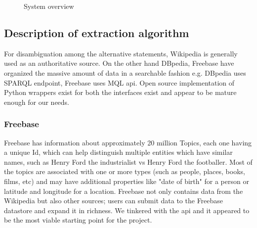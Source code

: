 \documentclass[11pt]{article}
\begin{document}
\begin{figure}
  \centering
  \caption{System overview}
  \label{fig:system}
\end{figure}


\subsection{Description of extraction algorithm}

For disambiguation among the alternative statements, Wikipedia is generally used
as an authoritative source. On the other hand DBpedia, Freebase have organized the
massive amount of data in a searchable fashion e.g. DBpedia uses SPARQL endpoint,
Freebase uses MQL api. Open source implementation of Python wrappers exist for
both the interfaces exist and appear to be mature enough for our needs.

\subsubsection{Freebase} 
Freebase has information about approximately 20 million Topics, each one having a
unique Id, which can help distinguish multiple entities which have similar names,
such as Henry Ford the industrialist vs Henry Ford the footballer. Most of the
topics are associated with one or more types\cite{freebasetype} (such as
people, places, books, films, etc) and may have additional properties like "date of birth" for a person
or latitude and longitude for a location. Freebase not only contains data from
the Wikipedia but also other sources; users can submit data to the Freebase
datastore and expand it in richness. We tinkered with the api\cite{freebaseapi}
and it appeared to be the most viable starting point for the project.
\end{document}
